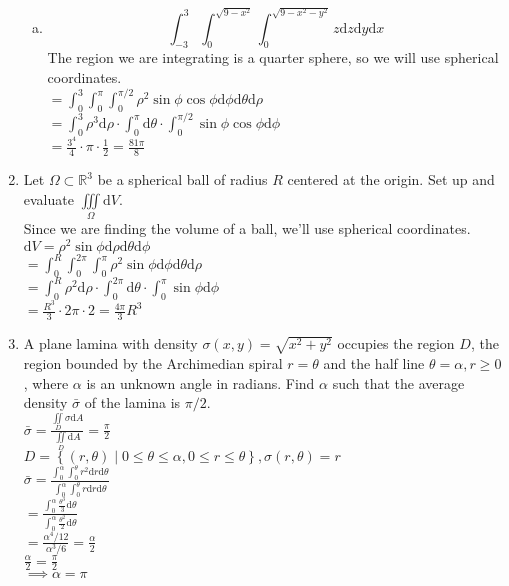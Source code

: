 \begin{enumerate}
\begin{enumerate}[a.]
		\item \begin{equation*}
			\int_{-3}^{3}{\int_{0}^{\sqrt{9 - x^2}}{\int_{0}^{\sqrt{9 - x^2 - y^2}}{z\mathrm{d}z}\mathrm{d}y}\mathrm{d}x}
		\end{equation*}
		\indent
		The region we are integrating is a quarter sphere, so we will use spherical coordinates.\\
		$= \int_{0}^{3}{\int_{0}^{\pi}{\int_{0}^{\pi/2}{\rho^2\sin{\phi}\cos{\phi}\mathrm{d}\phi}\mathrm{d}\theta}\mathrm{d}\rho}$\\
		$= \int_{0}^{3}{\rho^3\mathrm{d}\rho}\cdot\int_{0}^{\pi}{\mathrm{d}\theta} \cdot \int_{0}^{\pi/2}{\sin{\phi}\cos{\phi}\mathrm{d}\phi}$\\
		$= \frac{3^4}{4} \cdot \pi \cdot \frac{1}{2} = \frac{81\pi}{8}$\\
	\end{enumerate}
	
	\item Let $\Omega \subset \mathbb{R}^3$ be a spherical ball of radius $R$ centered at the origin. Set up and evaluate $\iiint\limits_{\Omega}{\mathrm{d}V}$.\\
	\indent
	Since we are finding the volume of a ball, we'll use spherical coordinates.\\
	$\mathrm{d}V = \rho^2\sin{\phi}\mathrm{d}\rho\mathrm{d}\theta\mathrm{d}\phi$\\
	$= \int_{0}^{R}{\int_{0}^{2\pi}{\int_{0}^{\pi}{\rho^2\sin{\phi}\mathrm{d}\phi}\mathrm{d}\theta}\mathrm{d}\rho}$\\
	$= \int_{0}^{R}{\rho^2\mathrm{d}\rho} \cdot \int_{0}^{2\pi}{\mathrm{d}\theta} \cdot \int_{0}^{\pi}{\sin{\phi}\mathrm{d}\phi}$\\
	$= \frac{R^3}{3} \cdot 2\pi \cdot 2 = \frac{4\pi}{3}R^3$\\
	
	\item A plane lamina with density $\sigma(x,y) = \sqrt{x^2+y^2}$ occupies the region $D$, the region bounded by the Archimedian spiral $r = \theta$ and the half line $\theta = \alpha, r \geq 0$, where $\alpha$ is an unknown angle in radians. Find $\alpha$ such that the average density $\bar{\sigma}$ of the lamina is $\pi / 2$.\\
	\indent
	$\bar{\sigma} = \frac{\iint\limits_{D}{\sigma\mathrm{d}A}}{\iint\limits_{D}{\mathrm{d}A}} = \frac{\pi}{2}$\\
	$D = \left\{(r,\theta) \mid 0 \leq \theta \leq \alpha, 0 \leq r \leq \theta \right\}, \sigma(r,\theta) = r$\\
	$\bar{\sigma} = \frac{\int_{0}^{\alpha}{\int_{0}^{\theta}{r^2\mathrm{d}r}\mathrm{d}\theta}}{\int_{0}^{\alpha}{\int_{0}^{\theta}{r\mathrm{d}r}\mathrm{d}\theta}}$\\
	$= \frac{\int_{0}^{\alpha}{\frac{\theta^3}{3}\mathrm{d}\theta}}{\int_{0}^{\alpha}{\frac{\theta^2}{2}\mathrm{d}\theta}}$\\
	$= \frac{\alpha^4/12}{\alpha^3/6} = \frac{\alpha}{2}$\\
	$\frac{\alpha}{2} = \frac{\pi}{2}$\\
	$\implies \alpha = \pi$\\
	

\end{enumerate}
